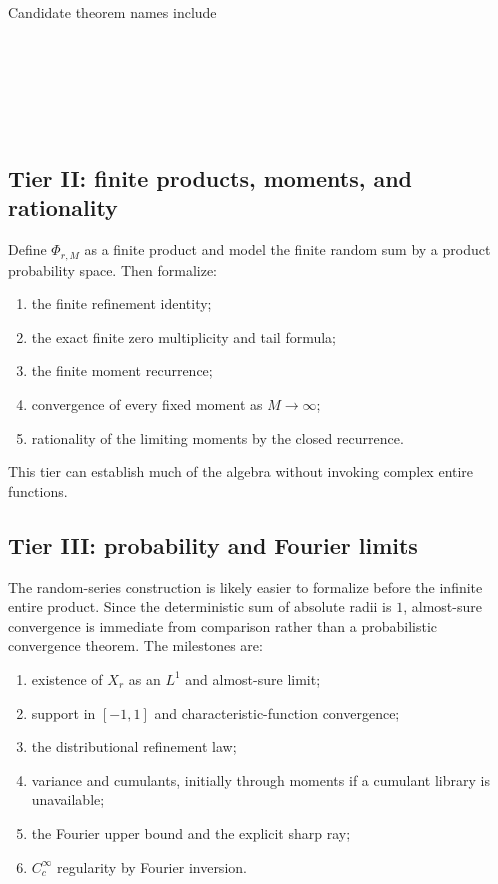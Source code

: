 \documentclass[11pt,oneside]{article}
\theoremstyle{definition}
\theoremstyle{remark}
\begin{document}
Candidate theorem names include
\begin{center}
\begin{minipage}{0.88\textwidth}
\small
{}\\
\\
\\
\\
\\
\end{minipage}
\end{center}

\subsection{Tier II: finite products, moments, and rationality}

Define $\Phi_{r,M}$ as a finite product and model the finite random sum by a product probability space.  Then formalize:
\begin{enumerate}[label=\textbf{II.\arabic*}]
\item the finite refinement identity;
\item the exact finite zero multiplicity and tail formula;
\item the finite moment recurrence;
\item convergence of every fixed moment as $M\to\infty$;
\item rationality of the limiting moments by the closed recurrence.
\end{enumerate}
This tier can establish much of the algebra without invoking complex entire functions.

\subsection{Tier III: probability and Fourier limits}

The random-series construction is likely easier to formalize before the infinite entire product.  Since the deterministic sum of absolute radii is $1$, almost-sure convergence is immediate from comparison rather than a probabilistic convergence theorem.  The milestones are:
\begin{enumerate}[label=\textbf{III.\arabic*}]
\item existence of $X_r$ as an $L^1$ and almost-sure limit;
\item support in $[-1,1]$ and characteristic-function convergence;
\item the distributional refinement law;
\item variance and cumulants, initially through moments if a cumulant library is unavailable;
\item the Fourier upper bound and the explicit sharp ray;
\item $C_c^\infty$ regularity by Fourier inversion.
\end{enumerate}
\end{document}
